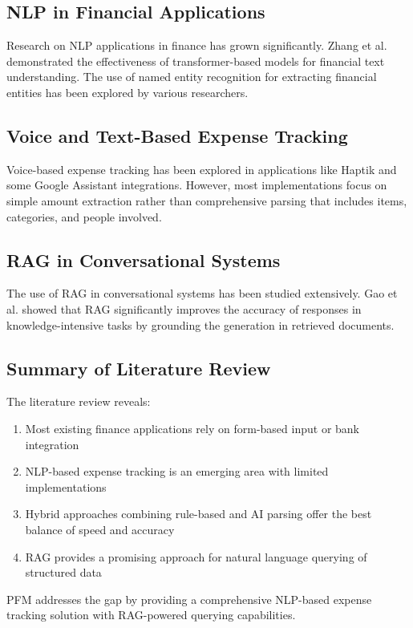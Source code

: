 \subsection{NLP in Financial Applications}

Research on NLP applications in finance has grown significantly. Zhang et al. \cite{zhang2020nlp} demonstrated the effectiveness of transformer-based models for financial text understanding. The use of named entity recognition for extracting financial entities has been explored by various researchers.

\subsection{Voice and Text-Based Expense Tracking}

Voice-based expense tracking has been explored in applications like Haptik and some Google Assistant integrations. However, most implementations focus on simple amount extraction rather than comprehensive parsing that includes items, categories, and people involved.

\subsection{RAG in Conversational Systems}

The use of RAG in conversational systems has been studied extensively. Gao et al. \cite{gao2023retrieval} showed that RAG significantly improves the accuracy of responses in knowledge-intensive tasks by grounding the generation in retrieved documents.

\subsection{Summary of Literature Review}

The literature review reveals:

\begin{enumerate}
    \item Most existing finance applications rely on form-based input or bank integration
    \item NLP-based expense tracking is an emerging area with limited implementations
    \item Hybrid approaches combining rule-based and AI parsing offer the best balance of speed and accuracy
    \item RAG provides a promising approach for natural language querying of structured data
\end{enumerate}

PFM addresses the gap by providing a comprehensive NLP-based expense tracking solution with RAG-powered querying capabilities.
